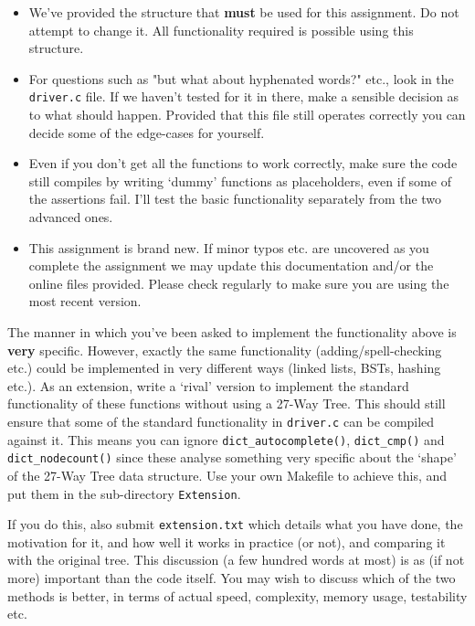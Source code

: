 \begin{exercise}
\begin{itemize}

\item We've provided the structure that {\bf must} be used for this
assignment.  Do not attempt to change it. All functionality required is
possible using this structure.

\item For questions such as "but what about hyphenated words?" etc., look
in the \verb^driver.c^ file. If we haven't tested for it in there, make a
sensible decision as to what should happen. Provided that this file still
operates correctly you can decide some of the edge-cases for yourself.

\item Even if you don't get all the functions to work correctly, make sure
the code still compiles by writing `dummy' functions as placeholders,
even if some of the assertions fail. I'll test the basic functionality
separately from the two advanced ones.

\item This assignment is brand new. If minor typos etc. are uncovered
as you complete the assignment we may update this documentation and/or
the online files provided. Please check regularly to make sure you are
using the most recent version.

\end{itemize}

\vspace*{1cm}
\vspace*{1ex}

\noindent The manner in which you've been asked to implement the
functionality above is {\bf very} specific. However, exactly the same
functionality (adding/spell-checking etc.)  could be implemented in very
different ways (linked lists, BSTs, hashing etc.).  As an extension,
write a `rival' version to implement the standard functionality of these
functions without using a 27-Way Tree.  This should still ensure that
some of the standard functionality in \verb^driver.c^ can be compiled
against it. This means you can ignore \verb^dict_autocomplete()^,
\verb^dict_cmp()^ and \verb^dict_nodecount()^ since these analyse
something very specific about the `shape' of the 27-Way Tree data
structure.  Use your own Makefile to achieve this, and put them in the
sub-directory \verb^Extension^.

If you do this, also submit \verb^extension.txt^ which details what you
have done, the motivation for it, and how well it works in practice
(or not), and comparing it with the original tree.  This discussion
(a few hundred words at most) is as (if not more) important than the
code itself. You may wish to discuss which of the two methods is better,
in terms of actual speed, complexity, memory usage, testability etc.


\end{exercise}
